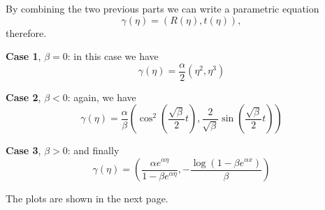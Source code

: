 \documentclass[11pt]{article}
\begin{document}
\begin{solution}
By combining the two previous parts we can write a parametric equation
\begin{displaymath}
  \gamma(\eta) = (R(\eta), t(\eta)),
\end{displaymath}
therefore.

\textbf{Case 1}, $\beta=0$: in this case we have
\begin{displaymath}
  \gamma(\eta) = \frac{\alpha}{2}\left( \eta^2, \eta^3\right)
\end{displaymath}


\textbf{Case 2}, $\beta<0$: again, we have
\begin{displaymath}
  \gamma(\eta) = \frac{\alpha}{\beta}\left( \cos^2\left( \frac{\sqrt{\beta}}{2}t\right), \frac{2}{\sqrt{\beta}}\sin\left(\frac{\sqrt{\beta}}{2}t \right) \right)
\end{displaymath}

\textbf{Case 3}, $\beta>0$: and finally
\begin{displaymath}
  \gamma(\eta) = \left(\frac{\alpha e^{\alpha\eta}}{1-\beta e^{\alpha\eta}}, -\frac{\log \left(1-\beta  e^{\alpha  x}\right)}{\beta }\right)
\end{displaymath}
\end{solution}
The plots are shown in the next page.

\end{document}

